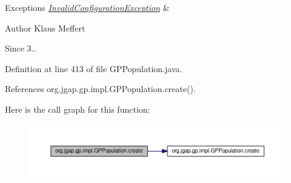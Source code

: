 \begin{DoxyExceptions}{Exceptions}
{\em \hyperlink{classorg_1_1jgap_1_1_invalid_configuration_exception}{Invalid\-Configuration\-Exception}} & \\
\hline
\end{DoxyExceptions}
\begin{DoxyAuthor}{Author}
Klaus Meffert 
\end{DoxyAuthor}
\begin{DoxySince}{Since}
3.. 
\end{DoxySince}


Definition at line 413 of file G\-P\-Population.\-java.



References org.\-jgap.\-gp.\-impl.\-G\-P\-Population.\-create().



Here is the call graph for this function\-:
\nopagebreak
\begin{figure}[H]
\begin{center}
\leavevmode
\includegraphics[width=350pt]{classorg_1_1jgap_1_1gp_1_1impl_1_1_g_p_population_a3ba57ecc975cad55e2868567baf248e9_cgraph}
\end{center}
\end{figure}


